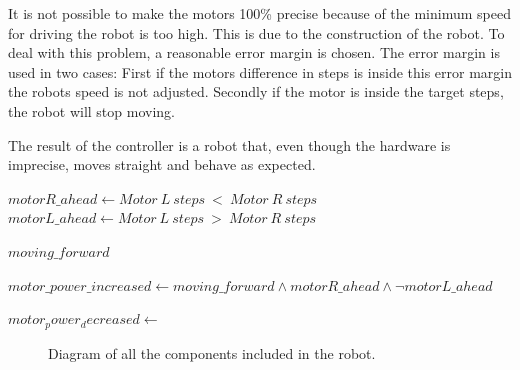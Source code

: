 It is not possible to make the motors 100\% precise because of the minimum speed for driving the robot is too high. This is due to the construction of the robot. To deal with this problem, a reasonable error margin is chosen. The error margin is used in two cases: First if the motors difference in steps is inside this error margin the robots speed is not adjusted. Secondly if the motor is inside the target steps, the robot will stop moving.  

The result of the controller is a robot that, even though the hardware is imprecise, moves straight and behave as expected.


$motorR\_ahead \leftarrow Motor~L~steps~<~Motor~R~steps$
$motorL\_ahead \leftarrow Motor~L~steps~>~Motor~R~steps$



$moving\_forward$

$ motor\_power\_increased \leftarrow moving\_forward \land motorR\_ahead \land \lnot motorL\_ahead$


$motor_power_decreased \leftarrow $ 


\begin{figure}[H]
     \caption{\label{fig:robot_overview} Diagram of all the components included in the robot.}
\end{figure}

